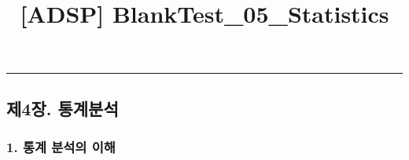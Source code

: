 \documentclass[11pt]{article}
\title{[ADSP] BlankTest\_05\_Statistics}
\begin{document}
    
    
    \maketitle
    
    

    
    \begin{center}\rule{0.5\linewidth}{\linethickness}\end{center}

    \hypertarget{uxc81c4uxc7a5.-uxd1b5uxacc4uxbd84uxc11d}{%
\subsection{제4장.
통계분석}\label{uxc81c4uxc7a5.-uxd1b5uxacc4uxbd84uxc11d}}

    \hypertarget{uxd1b5uxacc4-uxbd84uxc11duxc758-uxc774uxd574}{%
\subsubsection{1. 통계 분석의
이해}\label{uxd1b5uxacc4-uxbd84uxc11duxc758-uxc774uxd574}}
\end{document}
